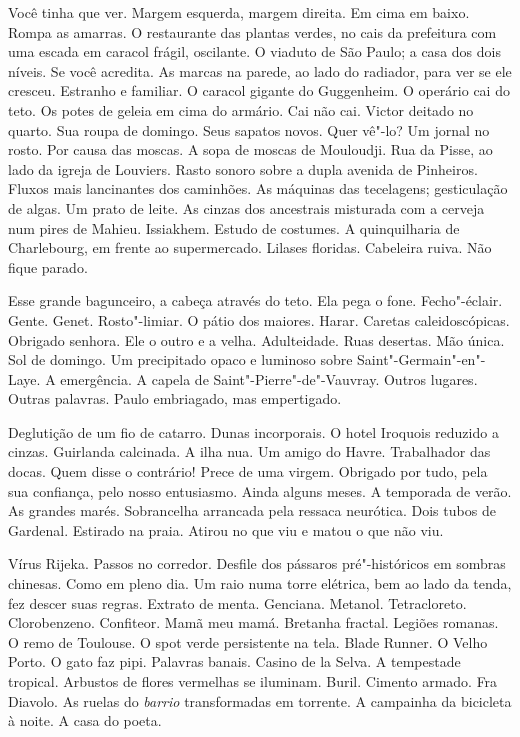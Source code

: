 Você tinha que ver. Margem esquerda, margem direita. Em cima em baixo.
Rompa as amarras. O restaurante das plantas verdes, no cais da
prefeitura com uma escada em caracol frágil, oscilante. O viaduto de São
Paulo; a casa dos dois níveis. Se você acredita. As marcas na parede, ao
lado do radiador, para ver se ele cresceu. Estranho e familiar. O
caracol gigante do Guggenheim. O operário cai do teto. Os potes de
geleia em cima do armário. Cai não cai. Victor deitado no quarto. Sua
roupa de domingo. Seus sapatos novos. Quer vê"-lo? Um jornal no rosto.
Por causa das moscas. A sopa de moscas de Mouloudji. Rua da Pisse, ao
lado da igreja de Louviers. Rasto sonoro sobre a dupla avenida de
Pinheiros. Fluxos mais lancinantes dos caminhões. As máquinas das
tecelagens; gesticulação de algas. Um prato de leite. As cinzas dos
ancestrais misturada com a cerveja num pires de Mahieu. Issiakhem.
Estudo de costumes. A quinquilharia de Charlebourg, em frente ao
supermercado. Lilases floridas. Cabeleira ruiva. Não fique parado.

Esse grande bagunceiro, a cabeça através do teto. Ela pega o fone.
Fecho"-éclair. Gente. Genet. Rosto"-limiar. O pátio dos maiores. Harar.
Caretas caleidoscópicas. Obrigado senhora. Ele o outro e a velha.
Adulteidade. Ruas desertas. Mão única. Sol de domingo. Um precipitado
opaco e luminoso sobre Saint"-Germain"-en"-Laye. A emergência. A capela de
Saint"-Pierre"-de"-Vauvray. Outros lugares. Outras palavras. Paulo
embriagado, mas empertigado.

Deglutição de um fio de catarro. Dunas incorporais. O hotel Iroquois
reduzido a cinzas. Guirlanda calcinada. A ilha nua. Um amigo do Havre.
Trabalhador das docas. Quem disse o contrário! Prece de uma virgem.
Obrigado por tudo, pela sua confiança, pelo nosso entusiasmo. Ainda
alguns meses. A temporada de verão. As grandes marés. Sobrancelha
arrancada pela ressaca neurótica. Dois tubos de Gardenal. Estirado na
praia. Atirou no que viu e matou o que não viu.

Vírus Rijeka. Passos no corredor. Desfile dos pássaros pré"-históricos em
sombras chinesas. Como em pleno dia. Um raio numa torre elétrica, bem ao
lado da tenda, fez descer suas regras. Extrato de menta. Genciana.
Metanol. Tetracloreto. Clorobenzeno. Confiteor. Mamã meu mamá. Bretanha
fractal. Legiões romanas. O remo de Toulouse. O spot verde persistente
na tela. Blade Runner. O Velho Porto. O gato faz pipi. Palavras banais.
Casino de la Selva. A tempestade tropical. Arbustos de flores vermelhas
se iluminam. Buril. Cimento armado. Fra Diavolo. As ruelas do
\emph{barrio} transformadas em torrente. A campainha da bicicleta à
noite. A casa do poeta.

